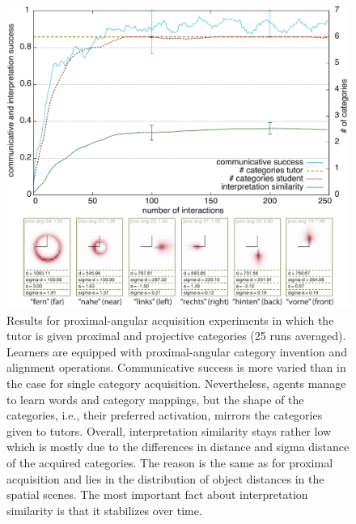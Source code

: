 \begin{figure}
\begin{center}
\includegraphics[width=0.9\columnwidth]{figs/category-acquisition-proximal-angular-results+categories}
\end{center}
\caption[Results for proximal-angular acquisition experiments]{%
Results for proximal-angular acquisition experiments in which the tutor
is given proximal and projective categories (25 runs averaged). Learners are 
equipped with proximal-angular category invention and alignment operations.
Communicative success is more varied than in the case for single category acquisition.
Nevertheless, agents manage to learn words and category mappings, but the shape 
of the categories, i.e., their preferred activation, mirrors the categories given to tutors. 
Overall, interpretation similarity stays rather low which is mostly due to the differences 
in distance and sigma distance of the acquired categories. The reason is the same as
for proximal acquisition and lies in the distribution of object distances in the spatial scenes. 
The most important fact about interpretation similarity is that it stabilizes over time.}
\label{f:category-acquisition-proximal-angular-results}
\end{figure}

